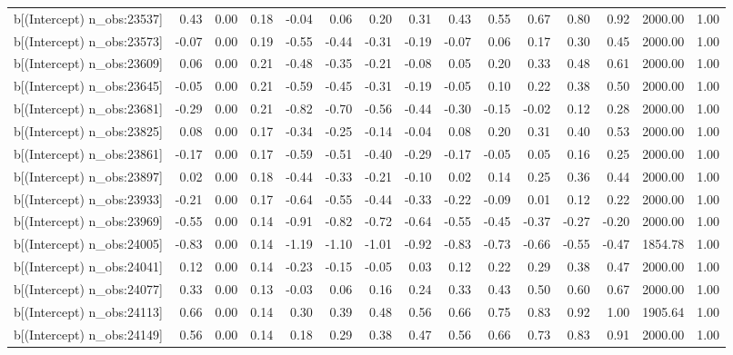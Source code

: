 \begin{table}[ht]
\begin{tabular}{rrrrrrrrrrrrrrr}
  b[(Intercept) n\_obs:23537] & 0.43 & 0.00 & 0.18 & -0.04 & 0.06 & 0.20 & 0.31 & 0.43 & 0.55 & 0.67 & 0.80 & 0.92 & 2000.00 & 1.00 \\ 
  b[(Intercept) n\_obs:23573] & -0.07 & 0.00 & 0.19 & -0.55 & -0.44 & -0.31 & -0.19 & -0.07 & 0.06 & 0.17 & 0.30 & 0.45 & 2000.00 & 1.00 \\ 
  b[(Intercept) n\_obs:23609] & 0.06 & 0.00 & 0.21 & -0.48 & -0.35 & -0.21 & -0.08 & 0.05 & 0.20 & 0.33 & 0.48 & 0.61 & 2000.00 & 1.00 \\ 
  b[(Intercept) n\_obs:23645] & -0.05 & 0.00 & 0.21 & -0.59 & -0.45 & -0.31 & -0.19 & -0.05 & 0.10 & 0.22 & 0.38 & 0.50 & 2000.00 & 1.00 \\ 
  b[(Intercept) n\_obs:23681] & -0.29 & 0.00 & 0.21 & -0.82 & -0.70 & -0.56 & -0.44 & -0.30 & -0.15 & -0.02 & 0.12 & 0.28 & 2000.00 & 1.00 \\ 
  b[(Intercept) n\_obs:23825] & 0.08 & 0.00 & 0.17 & -0.34 & -0.25 & -0.14 & -0.04 & 0.08 & 0.20 & 0.31 & 0.40 & 0.53 & 2000.00 & 1.00 \\ 
  b[(Intercept) n\_obs:23861] & -0.17 & 0.00 & 0.17 & -0.59 & -0.51 & -0.40 & -0.29 & -0.17 & -0.05 & 0.05 & 0.16 & 0.25 & 2000.00 & 1.00 \\ 
  b[(Intercept) n\_obs:23897] & 0.02 & 0.00 & 0.18 & -0.44 & -0.33 & -0.21 & -0.10 & 0.02 & 0.14 & 0.25 & 0.36 & 0.44 & 2000.00 & 1.00 \\ 
  b[(Intercept) n\_obs:23933] & -0.21 & 0.00 & 0.17 & -0.64 & -0.55 & -0.44 & -0.33 & -0.22 & -0.09 & 0.01 & 0.12 & 0.22 & 2000.00 & 1.00 \\ 
  b[(Intercept) n\_obs:23969] & -0.55 & 0.00 & 0.14 & -0.91 & -0.82 & -0.72 & -0.64 & -0.55 & -0.45 & -0.37 & -0.27 & -0.20 & 2000.00 & 1.00 \\ 
  b[(Intercept) n\_obs:24005] & -0.83 & 0.00 & 0.14 & -1.19 & -1.10 & -1.01 & -0.92 & -0.83 & -0.73 & -0.66 & -0.55 & -0.47 & 1854.78 & 1.00 \\ 
  b[(Intercept) n\_obs:24041] & 0.12 & 0.00 & 0.14 & -0.23 & -0.15 & -0.05 & 0.03 & 0.12 & 0.22 & 0.29 & 0.38 & 0.47 & 2000.00 & 1.00 \\ 
  b[(Intercept) n\_obs:24077] & 0.33 & 0.00 & 0.13 & -0.03 & 0.06 & 0.16 & 0.24 & 0.33 & 0.43 & 0.50 & 0.60 & 0.67 & 2000.00 & 1.00 \\ 
  b[(Intercept) n\_obs:24113] & 0.66 & 0.00 & 0.14 & 0.30 & 0.39 & 0.48 & 0.56 & 0.66 & 0.75 & 0.83 & 0.92 & 1.00 & 1905.64 & 1.00 \\ 
  b[(Intercept) n\_obs:24149] & 0.56 & 0.00 & 0.14 & 0.18 & 0.29 & 0.38 & 0.47 & 0.56 & 0.66 & 0.73 & 0.83 & 0.91 & 2000.00 & 1.00 \\ 

\end{tabular}
\end{table}
